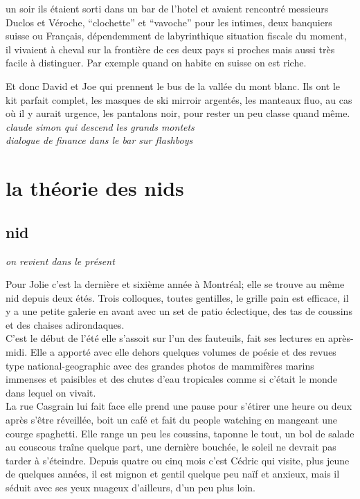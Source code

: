 \documentclass{article}
\begin{document}
un soir ils étaient sorti dans un bar de l'hotel et avaient rencontré messieurs
Duclos et Véroche, ``clochette'' et ``vavoche'' pour les intimes, deux banquiers
suisse ou Français, dépendemment de labyrinthique situation fiscale du moment,
il vivaient à cheval sur la frontière de ces deux pays si proches mais aussi
très facile à distinguer. Par exemple quand on habite en suisse on est riche.

Et donc David et Joe qui prennent le bus de la vallée du mont blanc. Ils ont
le kit parfait complet, les masques de ski mirroir argentés, les manteaux fluo,
au cas où il y aurait urgence, les pantalons noir, pour rester un peu classe
quand même.
\\

\textit{claude simon qui descend les grands montets}\\

\textit{dialogue de finance dans le bar sur flashboys}\\





\clearpage


\section{la théorie des nids}

\subsection{nid}

\textit{on revient dans le présent}

Pour Jolie c’est la dernière et sixième année à Montréal; elle se
trouve au même nid depuis deux étés. Trois colloques, toutes
gentilles, le grille pain est efficace, il y a une petite galerie en
avant avec un set de patio éclectique, des tas de coussins et des
chaises adirondaques. \\

C’est le début de l’été elle s’assoit sur l’un
des fauteuils, fait ses lectures en après-midi. Elle a apporté avec
elle dehors quelques volumes de poésie et des revues type
national-geographic avec des grandes photos de mammifères marins
immenses et paisibles et des chutes d’eau tropicales comme si c’était
le monde dans lequel on vivait. \\

La rue Casgrain lui fait face elle
prend une pause pour s’étirer une heure ou deux après s’être
réveillée, boit un café et fait du people watching en mangeant une
courge spaghetti. Elle range un peu les coussins, taponne le tout, un
bol de salade au couscous traîne quelque part, une dernière bouchée,
le soleil ne devrait pas tarder à s’éteindre. Depuis quatre ou cinq
mois c’est Cédric qui visite, plus jeune de quelques années, il est
mignon et gentil quelque peu naïf et anxieux, mais il séduit avec ses
yeux nuageux d’ailleurs, d’un peu plus loin.\\
\end{document}
